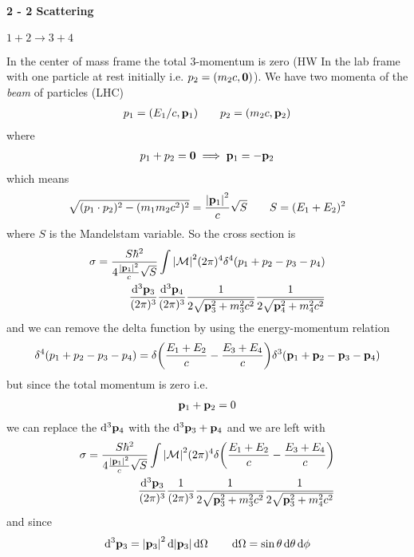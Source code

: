 \documentclass[../main.tex]{subfiles}
\begin{document}
\newpage
\paragraph*{2 - 2 Scattering} $1 + 2 \to 3 + 4$

In the center of mass frame the total 3-momentum is zero (HW In the lab frame with one particle at rest initially i.e. $p_2 = (m_2 c, \vb 0)$). 
We have two momenta of the \emph{beam} of particles (LHC)
\begin{align*}
    p_1 = (E_1/c, \vb p_1) \qquad p_2 = (m_2 c, \vb p_2)
\end{align*}
where
\begin{align*}
    p_1 + p_2 = \vb 0 \implies \vb p_1 = -\vb p_2
\end{align*}
which means
\begin{align*}
    \sqrt{(p_1 \cdot p_2)^2 - (m_1 m_2 c^2)^2} = \frac{\abs{\vb p_1}^2}{c} \sqrt{S} \qquad S = (E_1 + E_2)^2
\end{align*}
where $S$ is the Mandelstam variable. So the cross section is
\begin{align*}
    \sigma = \frac{S \hbar^2}{4\frac{\abs{\vb p_1}^2}{c} \sqrt{S}} \int \abs{\mathcal{M}}^2 (2\pi)^4
    \delta^4(p_1 + p_2 - p_3 - p_4) \\
    \frac{\dd^3 \vb p_3}{(2\pi)^3}
    \frac{\dd^3 \vb p_4}{(2\pi)^3}
    \frac{1}{2\sqrt{\vb p_3^2 + m_3^2 c^2}} 
    \frac{1}{2\sqrt{\vb p_4^2 + m_4^2 c^2}}
\end{align*}
and we can remove the delta function by using the energy-momentum relation
\begin{align*}
\delta^4(p_1 + p_2 - p_3 - p_4) = \delta \qt(\frac{E_1 + E_2}{c} - \frac{E_3 + E_4}{c}) 
\delta^3(\vb p_1 + \vb p_2 - \vb p_3 - \vb p_4)
\end{align*}
but since the total momentum is zero i.e. 
\begin{align*}
    \vb p_1 + \vb p_2 = 0
\end{align*}
we can replace the $\dd^3 \vb p_4$ with the $\dd^3{\vb p_3 + \vb p_4}$ and we are left with
\begin{align*}
    \sigma =  \frac{S \hbar^2}{4\frac{\abs{\vb p_1}^2}{c} \sqrt{S}} \int \abs{\mathcal{M}}^2 (2\pi)^4
    \delta \qt(\frac{E_1 + E_2}{c} - \frac{E_3 + E_4}{c}) \\
    \frac{\dd^3 \vb p_3}{(2\pi)^3} \frac{1}{(2\pi)^3} \frac{1}{2\sqrt{\vb p_3^2 + m_3^2 c^2}}
    \frac{1}{2\sqrt{\vb p_3^2 + m_4^2 c^2}}
\end{align*}
and since
\begin{align*}
    \dd^3 \vb p_3 = \abs{\vb p_3}^2 \dd{\abs{\vb p_3}} \dd{\Omega} \qquad \dd{\Omega} = \sin\theta \dd{\theta} \dd{\phi}
\end{align*}
\end{document}
